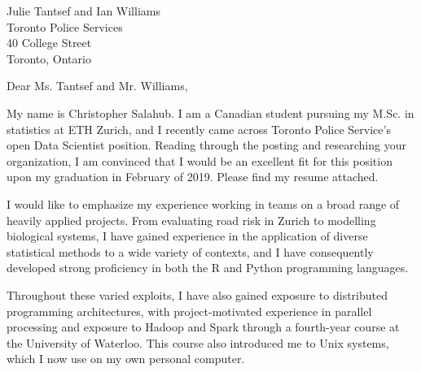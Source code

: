 \documentclass[11pt,a4paper,sans]{letter}
\begin{document}
	\begin{letter}{Julie Tantsef and Ian Williams \\ Toronto Police Services \\ 40 College Street \\ Toronto, Ontario}

		\opening{Dear Ms. Tantsef and Mr. Williams,}
		
		My name is Christopher Salahub. I am a Canadian student pursuing my M.Sc. in statistics at ETH Zurich, and I recently came across Toronto Police Service's open Data Scientist position. Reading through the posting and researching your organization, I am convinced that I would be an excellent fit for this position upon my graduation in February of 2019. Please find my resume attached.
		
		\begin{comment}Starmind aims to remove the "e-mail lottery" expertise method from large organizations, so I would like to begin by emphasizing my experience working with text data. For my publication, \href{https://rss.onlinelibrary.wiley.com/doi/full/10.1111/j.1740-9713.2018.01148.x}{\textit{About ``her emails''}}, I used regular expressions and other tools to extract, parse, filter, and analyse a corpus of almost 33,000 emails, before finally displaying these in an \href{https://shiny.math.uwaterloo.ca/sas/clinton/}{interactive web application}. This entire project was executed in R, and has made me adept at identifying and explaining errors and inconsistencies in real-world text data, experience which I believe would be a great asset to your company.
		\end{comment}
		
		I would like to emphasize my experience working in teams on a broad range of heavily applied projects. From evaluating road risk in Zurich to modelling biological systems, I have gained experience in the application of diverse statistical methods to a wide variety of contexts, and I have consequently developed strong proficiency in both the R and Python programming languages. \begin{comment}In particular, note my experience working alongside doctors in the analysis of healthcare data as part of my statistical consulting course at ETH Z\"urich. This project gave me experience handling medical data, with all of the extra privacy considerations that entails, and also developed my sensitivity and consideration of the ultimate beneficiaries of the analysis: patients. \end{comment}
		Throughout these varied exploits, I have also gained exposure to distributed programming architectures, with project-motivated experience in parallel processing and exposure to Hadoop and Spark through a fourth-year course at the University of Waterloo. This course also introduced me to Unix systems, which I now use on my own personal computer.
		

\end{letter}
\end{document}
